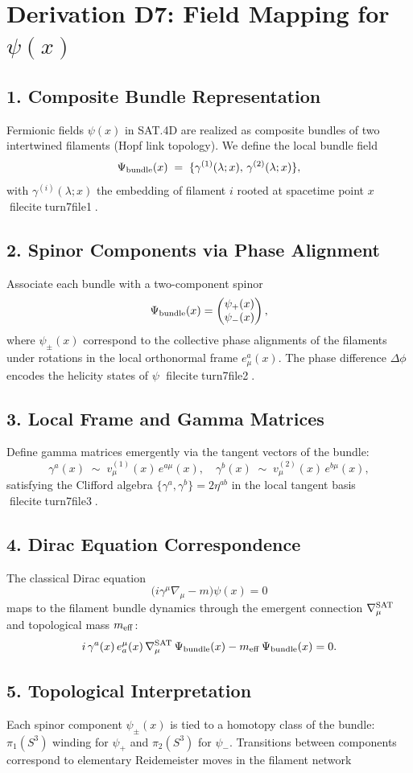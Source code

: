 

\section*{Derivation D7: Field Mapping for \(\psi(x)\)}
\subsection*{1. Composite Bundle Representation}
Fermionic fields \(\psi(x)\) in SAT.4D are realized as composite bundles of two intertwined filaments
(Hopf link topology). We define the local bundle field
\[
\Psi_{\rm bundle}(x) \;=\; \{\gamma^{(1)}(\lambda;x),\,\gamma^{(2)}(\lambda;x)\},
\]
with \(\gamma^{(i)}(\lambda;x)\) the embedding of filament \(i\) rooted at spacetime point \(x\) fileciteturn7file1.

\subsection*{2. Spinor Components via Phase Alignment}
Associate each bundle with a two-component spinor
\[
\Psi_{\rm bundle}(x) = \begin{pmatrix}\psi_+(x) \\ \psi_-(x)\end{pmatrix},
\]
where \(\psi_\pm(x)\) correspond to the collective phase alignments of the filaments
under rotations in the local orthonormal frame \(e_\mu^a(x)\). The phase difference \(\Delta\phi\)
encodes the helicity states of \(\psi\) fileciteturn7file2.

\subsection*{3. Local Frame and Gamma Matrices}
Define gamma matrices emergently via the tangent vectors of the bundle:
\[
\gamma^a(x) \;\sim\; v_\mu^{(1)}(x)\,e^{a\mu}(x),\quad
\gamma^b(x) \;\sim\; v_\mu^{(2)}(x)\,e^{b\mu}(x),
\]
satisfying the Clifford algebra \(\{\gamma^a,\gamma^b\}=2\eta^{ab}\) in the local tangent basis fileciteturn7file3.

\subsection*{4. Dirac Equation Correspondence}
The classical Dirac equation
\[
\bigl(i\gamma^\mu\nabla_\mu - m\bigr)\psi(x) = 0
\]
maps to the filament bundle dynamics through the emergent connection \(\nabla_\mu^{\rm SAT}\)
and topological mass \(m_{\rm eff}\):
\[
i\,\gamma^a(x)\,e^\mu_a(x)\,\nabla_\mu^{\rm SAT}\,\Psi_{\rm bundle}(x)
- m_{\rm eff}\,\Psi_{\rm bundle}(x) = 0.
\]

\subsection*{5. Topological Interpretation}
Each spinor component \(\psi_\pm(x)\) is tied to a homotopy class of the bundle:
\(\pi_1(S^3)\) winding for \(\psi_+\) and \(\pi_2(S^3)\) for \(\psi_-\).
Transitions between components correspond to elementary Reidemeister moves in the filament network 
